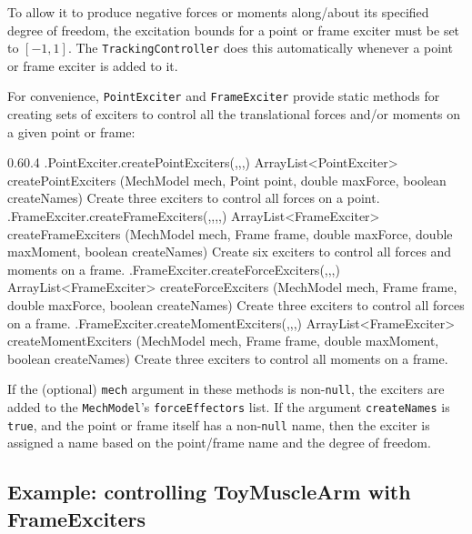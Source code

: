 To allow it to produce negative forces or moments along/about its specified
degree of freedom, the excitation bounds for a point or frame exciter
must be set to $[-1,1]$. The {\tt TrackingController} does this
automatically whenever a point or frame exciter is added to it.

For convenience, {\tt PointExciter} and {\tt FrameExciter} provide static
methods for creating sets of exciters to control all the translational
forces and/or moments on a given point or frame:
%
\begin{methodtable}{0.6}{0.4}
\midline
%
\methodentry
{\inverse.PointExciter.createPointExciters(,,,)}%
{ArrayList<PointExciter> createPointExciters (MechModel mech,\brh
Point point, double maxForce, boolean createNames)}%
{Create three exciters to control all forces on a point.}%
%
\methodspace{0.5em}%
\methodentry
{\inverse.FrameExciter.createFrameExciters(,,,,)}%
{ArrayList<FrameExciter> createFrameExciters (\brh MechModel mech,
Frame frame, double maxForce, \brh double maxMoment, boolean createNames)}%
{Create six exciters to control all forces and moments on a frame.}%
%
\methodspace{0.5em}%
\methodentry
{\inverse.FrameExciter.createForceExciters(,,,)}%
{ArrayList<FrameExciter> createForceExciters (MechModel mech,\brh
Frame frame, double maxForce, boolean createNames)}%
{Create three exciters to control all forces on a frame.}%
%
\methodspace{0.5em}%
\methodentry
{\inverse.FrameExciter.createMomentExciters(,,,)}%
{ArrayList<FrameExciter> createMomentExciters (\brh MechModel mech,
Frame frame, \brh double maxMoment, boolean createNames)}%
{Create three exciters to control all moments on a frame.}%
%
\midline
\end{methodtable}
%
If the (optional) {\tt mech} argument in these methods is
non-{\tt null}, the exciters are added to
the {\tt MechModel}'s {\tt forceEffectors} list.
If the argument {\tt createNames} is {\tt true},
and the point or frame itself has a non-{\tt null} name,
then the exciter is assigned a name based on the point/frame name
and the degree of freedom.

\subsection{Example: controlling ToyMuscleArm with FrameExciters}

